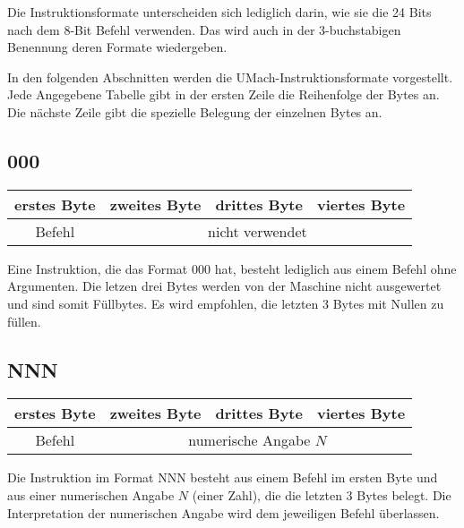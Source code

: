 Die Instruktionsformate unterscheiden sich lediglich darin, wie sie die 24 Bits
nach dem 8-Bit \gls{Befehl} verwenden. Das wird auch in der 3-buchstabigen
Benennung deren Formate wiedergeben.

In den folgenden Abschnitten werden die UMach-Instruktionsformate vorgestellt.
Jede Angegebene Tabelle gibt in der ersten Zeile die Reihenfolge der Bytes an. 
Die nächste Zeile gibt die spezielle Belegung der einzelnen Bytes an.



\subsection{000}
\label{000}

\begin{center}
  \begin{tabular}{|*{4}{c|}} \hline
    erstes Byte & zweites Byte  & drittes Byte  & viertes Byte \\\hline\hline
    Befehl      & \multicolumn{3}{c|}{nicht verwendet}         \\\hline
  \end{tabular}
\end{center}

Eine Instruktion, die das Format 000 hat, besteht lediglich aus einem Befehl
ohne Argumenten. Die letzen drei Bytes werden von der Maschine nicht
ausgewertet und sind somit Füllbytes. Es wird empfohlen, die letzten 3 Bytes mit
Nullen zu füllen.




\subsection{NNN}
\label{NNN}

\begin{center}
  \begin{tabular}{|*{4}{c|}}
    \hline
    erstes Byte  & zweites Byte  & drittes Byte  & viertes Byte \\\hline\hline
    Befehl       & \multicolumn{3}{c|}{numerische Angabe $N$}   \\\hline
  \end{tabular}
\end{center}

Die Instruktion im Format NNN besteht aus einem Befehl im ersten Byte und aus
einer numerischen Angabe  $N$ (einer Zahl), die die letzten 3 Bytes belegt.
Die Interpretation der numerischen Angabe wird dem jeweiligen Befehl überlassen.


